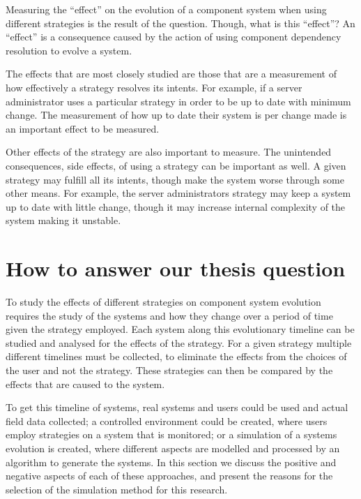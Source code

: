 Measuring the ``effect'' on the evolution of a component system when using different strategies is the result of the question. 
Though, what is this ``effect''?
An ``effect'' is a consequence caused by the action of using component dependency resolution to evolve a system.

The effects that are most closely studied are those that are a measurement of how effectively a strategy resolves its intents.
For example, if a server administrator uses a particular strategy in order to be up to date with minimum change.
The measurement of how up to date their system is per change made is an important effect to be measured.

Other effects of the strategy are also important to measure.
The unintended consequences, side effects, of using a strategy can be important as well.
A given strategy may fulfill all its intents, though make the system worse through some other means.
For example, the server administrators strategy may keep a system up to date with little change, 
though it may increase internal complexity of the system making it unstable. 

\section{How to answer our thesis question}
To study the effects of different strategies on component system evolution requires the study of the systems and how they change over a period of time given the strategy employed. 
Each system along this evolutionary timeline can be studied and analysed for the effects of the strategy.
For a given strategy multiple different timelines must be collected, to eliminate the effects from the choices of the user and not the strategy.
These strategies can then be compared by the effects that are caused to the system.

To get this timeline of systems, real systems and users could be used and actual field data collected;
a controlled environment could be created, where users employ strategies on a system that is monitored;
or a simulation of a systems evolution is created, where different aspects are modelled and processed by an algorithm to generate the systems.
In this section we discuss the positive and negative aspects of each of these approaches,
and present the reasons for the selection of the simulation method for this research.

